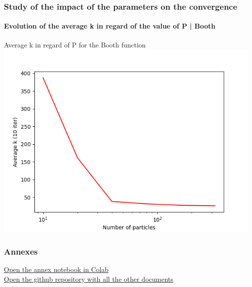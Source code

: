 \documentclass{beamer}
\begin{document}
	\begin{frame}
	\frametitle{\color{velvet} Study of the impact of the parameters on the convergence}
	\framesubtitle{Evolution of the average k in regard of the value of P | Booth}
	Average k in regard of P for the Booth function
	\includegraphics[scale=0.5]{Graphs/10.png}
	\end{frame}

	\begin{frame}
		\frametitle{\color{velvet} Annexes}

		\href{https://colab.research.google.com/drive/1-OzHX9b747wIw_0KCM51-NRGmR76BHQu?usp=sharing}{\color{velvet} Open the annex notebook in Colab} \\
		\href{https://github.com/Antix5/PSOchaos}{\color{velvet} Open the github repository with all the other documents}


	\end{frame}


	
	
\end{document}
